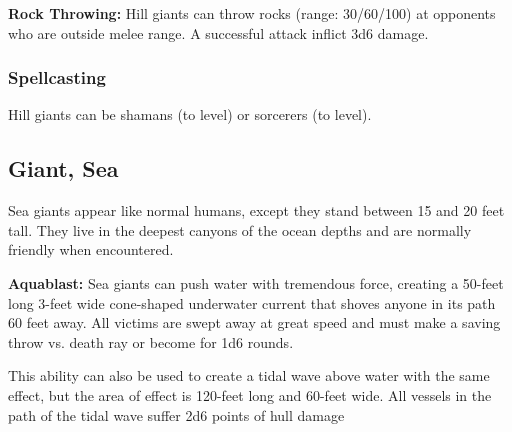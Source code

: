 \begin{multicols*}{2}
\textbf{Rock Throwing:} Hill giants can throw rocks (range: 30/60/100) at opponents who are outside melee range. A successful attack inflict 3d6 damage.

\subsubsection{Spellcasting}
Hill giants can be shamans (to  level) or sorcerers (to  level).

\subsection{Giant, Sea}

Sea giants appear like normal humans, except they stand between 15 and 20 feet tall. They live in the deepest canyons of the ocean depths and are normally friendly when encountered.

\textbf{Aquablast:} Sea giants can push water with tremendous force, creating a 50-feet long 3-feet wide cone-shaped underwater current that shoves anyone in its path 60 feet away. All victims are swept away at great speed and must make a saving throw vs. death ray or become  for 1d6 rounds.

This ability can also be used to create a tidal wave above water with the same effect, but the area of effect is 120-feet long and 60-feet wide. All vessels in the path of the tidal wave suffer 2d6 points of hull damage


\end{multicols*}
